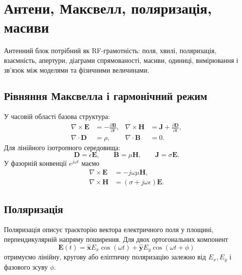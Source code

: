 \chapter{Антени, Максвелл, поляризація, масиви}
\label{chap:antenna-session07}


Антенний блок потрібний як RF-грамотність: поля, хвилі, поляризація, взаємність, апертури, діаграми спрямованості, масиви, одиниці, вимірювання і зв’язок між моделями та фізичними величинами.

\section{Рівняння Максвелла і гармонічний режим}

У часовій області базова структура:
\begin{align}
  \nabla\times \mathbf{E} &= -\frac{\partial \mathbf{B}}{\partial t}, &
  \nabla\times \mathbf{H} &= \mathbf{J}+\frac{\partial \mathbf{D}}{\partial t},\\
  \nabla\cdot \mathbf{D} &= \rho, &
  \nabla\cdot \mathbf{B} &= 0.
\end{align}
Для лінійного ізотропного середовища:
\begin{equation}
  \mathbf{D}=\epsilon \mathbf{E},\qquad \mathbf{B}=\mu \mathbf{H},\qquad \mathbf{J}=\sigma\mathbf{E}.
\end{equation}
У фазорній конвенції $e^{j\omega t}$ маємо
\begin{align}
  \nabla\times \mathbf{E} &= -j\omega\mu\mathbf{H},\\
  \nabla\times \mathbf{H} &= (\sigma+j\omega\epsilon)\mathbf{E}.
\end{align}

\section{Поляризація}

Поляризація описує траєкторію вектора електричного поля у площині, перпендикулярній напряму поширення. Для двох ортогональних компонент
\begin{equation}
  \mathbf{E}(t)=\hat{\mathbf{x}}E_x\cos(\omega t)+\hat{\mathbf{y}}E_y\cos(\omega t+\phi)
\end{equation}
отримуємо лінійну, кругову або еліптичну поляризацію залежно від $E_x,E_y$ і фазового зсуву $\phi$.

